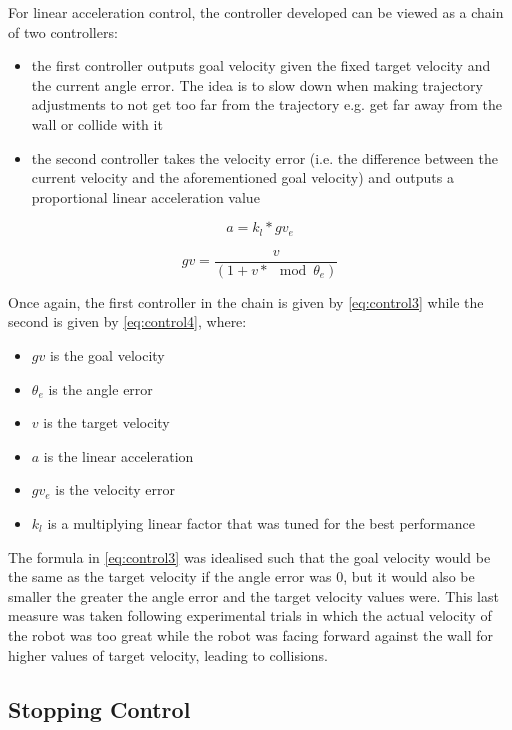 \documentclass[conference]{IEEEtran}
\begin{document}
For linear acceleration control, the controller developed can be viewed as a chain of two controllers:
\begin{itemize}
    \item the first controller outputs goal velocity given the fixed target velocity and the current angle error. The idea is to slow down when making trajectory adjustments to not get too far from the trajectory e.g. get far away from the wall or collide with it
    \item the second controller takes the velocity error (i.e. the difference between the current velocity and the aforementioned goal velocity) and outputs a proportional linear acceleration value
\end{itemize}

\begin{equation} \label{eq:control4}
    a = k_l * gv_e
\end{equation}

\begin{equation} \label{eq:control3}
    gv = \dfrac{v}{(1 + v * \mod{\theta_e})}
\end{equation}

Once again, the first controller in the chain is given by \ref{eq:control3} while the second is given by \ref{eq:control4}, where:
\begin{itemize}
    \item $gv$ is the goal velocity
    \item $\theta_e$ is the angle error
    \item $v$ is the target velocity
    \item $a$ is the linear acceleration
    \item $gv_e$ is the velocity error
    \item $k_l$ is a multiplying linear factor that was tuned for the best performance  %
\end{itemize}

The formula in \ref{eq:control3} was idealised such that the goal velocity would be the same as the target velocity if the angle error was 0, but it would also be smaller the greater the angle error and the target velocity values were. This last measure was taken following experimental trials in which the actual velocity of the robot was too great while the robot was facing forward against the wall for higher values of target velocity, leading to collisions.

\subsection{Stopping Control}
\end{document}
